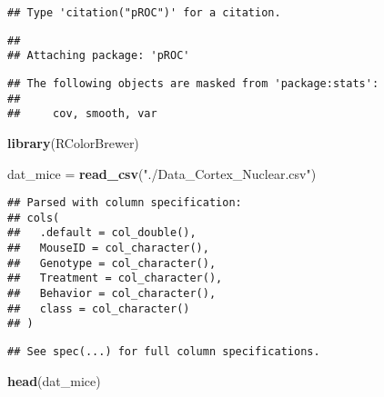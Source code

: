 \documentclass[]{article}
\newenvironment{Shaded}{\begin{snugshade}}{\end{snugshade}}
\newcommand{\KeywordTok}[1]{\textcolor[rgb]{0.13,0.29,0.53}{\textbf{#1}}}
\newcommand{\StringTok}[1]{\textcolor[rgb]{0.31,0.60,0.02}{#1}}
\newcommand{\NormalTok}[1]{#1}
\begin{document}
\begin{verbatim}
## Type 'citation("pROC")' for a citation.
\end{verbatim}

\begin{verbatim}
## 
## Attaching package: 'pROC'
\end{verbatim}

\begin{verbatim}
## The following objects are masked from 'package:stats':
## 
##     cov, smooth, var
\end{verbatim}

\begin{Shaded}
\begin{Highlighting}[]
\KeywordTok{library}\NormalTok{(RColorBrewer)}
\end{Highlighting}
\end{Shaded}

\begin{Shaded}
\begin{Highlighting}[]
\NormalTok{dat_mice =}\StringTok{ }\KeywordTok{read_csv}\NormalTok{(}\StringTok{"./Data_Cortex_Nuclear.csv"}\NormalTok{)}
\end{Highlighting}
\end{Shaded}

\begin{verbatim}
## Parsed with column specification:
## cols(
##   .default = col_double(),
##   MouseID = col_character(),
##   Genotype = col_character(),
##   Treatment = col_character(),
##   Behavior = col_character(),
##   class = col_character()
## )
\end{verbatim}

\begin{verbatim}
## See spec(...) for full column specifications.
\end{verbatim}

\begin{Shaded}
\begin{Highlighting}[]
\KeywordTok{head}\NormalTok{(dat_mice)}
\end{Highlighting}
\end{Shaded}
\end{document}
